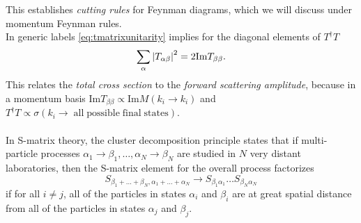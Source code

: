 This establishes \emph{cutting rules} for Feynman diagrams, which we will discuss under momentum Feynman rules.\\
In generic labels \ref{eq:tmatrixunitarity} implies for the diagonal elements of $T^\dagger T$
\begin{equation}
	\sum_\alpha \abs{T_{\alpha \beta}}^2 = 2 \mathrm{Im}T_{\beta  \beta}.
\end{equation}
This relates the \emph{total cross section} to the \emph{forward scattering amplitude}, because in a momentum basis $\mathrm{Im}T_{\beta\beta}\propto \mathrm{Im}M(k_i\rightarrow k_i)$ and $T^\dagger T\propto \sigma(k_i \rightarrow \mathrm{\;all\;possible\;final\;states})$.\\
\\
In S-matrix theory, the cluster decomposition principle states that if multi-particle processes $\alpha_1\rightarrow\beta_1,\dots,\alpha_N\rightarrow\beta_N$ are studied in $N$ very distant laboratories, then the S-matrix element for the overall process factorizes
\begin{equation*}
	S_{\beta_1+\dots + \beta_N,\alpha_1+\dots+\alpha_N}\rightarrow S_{\beta_1 \alpha_1} \dots S_{\beta_N \alpha_N} 
\end{equation*}
if for all $i\neq j$, all of the particles in states $\alpha_i$ and $\beta_i$ are at great spatial distance from all of the particles in states $\alpha_j$ and $\beta_j$.

